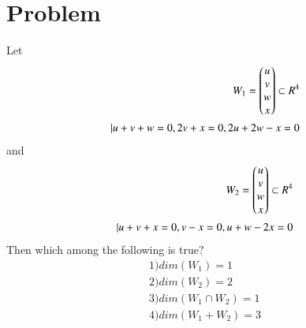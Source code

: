 \section{Problem}
Let 
\begin{align*}
    W_{1}=\begin{pmatrix}u\\v\\w\\x\end{pmatrix} \subset R^{4}\\ | u+v+w=0,2v+x=0,2u+2w-x=0
\end{align*}
and
\begin{align*}
    W_{2}=\begin{pmatrix}u\\v\\w\\x\end{pmatrix}\subset R^{4}\\ | u+v+x=0,v-x=0,u+w-2x=0
\end{align*}
Then which among the following is true$?$
\begin{align}
    1) dim(W_{1})=1
\\
    2) dim(W_{2})=2
\\
    3) dim(W_{1}\cap W_{2})=1
\\
    4) dim(W_{1}+W_{2})=3
\end{align}

